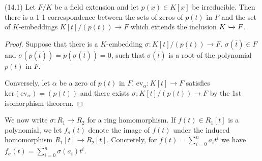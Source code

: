 \vspace{2ex}
\begin{prop}
(14.1) Let $F/K$ be a field extension and let $p(x)\in K[x]$ be irreducible. Then there is a 1-1 correspondence between the sets of zeros of $p(t)$ in $F$ and the set of $K$-embeddings $K[t]/(p(t))\rightarrow F$ which extends the inclusion $K\xhookrightarrow{}F$.
\end{prop}
\vspace{2ex}
\begin{proof}
Suppose that there is a $K$-embedding $\sigma :K[t]/(p(t))\rightarrow F$. $\sigma (\bar{t}) \in F$ and $\sigma (p(\bar{t}))=p(\sigma (\bar{t}))=0$, such that $\sigma (\bar{t})$ is a root of the polynomial $p(t)$ in $F$. 

\bigskip

Conversely, let $\alpha $ be a zero of $p(t)$ in $F$. $\mathrm{ev}_{\alpha }:K[t]\rightarrow F$ satisfies $\mathrm{ker}(\mathrm{ev}_{\alpha })=(p(t))$ and there exists $\sigma :K[t]/(p(t))\rightarrow F$ by the 1st isomorphism theorem.
\end{proof}
\vspace{2ex}
\begin{rmk}
We now write $\sigma :R_1\rightarrow R_2$ for a ring homomorphism. If $f(t)\in R_1[t]$ is a polynomial, we let $f_{\sigma }(t)$ denote the image of $f(t)$ under the induced homomorphism $R_1[t]\rightarrow R_2[t]$. Concretely, for $f(t)=\sum ^{n}_{i=0}a_{i}t^{i}$ we have $f_{\sigma }(t)=\sum ^{n}_{i=0}\sigma (a_{i})t^{i}$.
\end{rmk}
\vspace{2ex}
